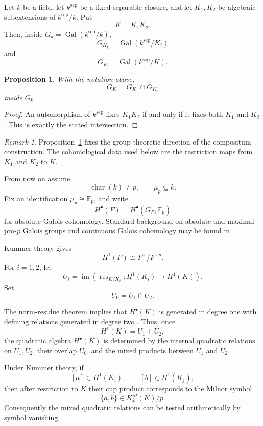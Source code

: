 \documentclass[12pt]{amsart}
\theoremstyle{plain}
\newtheorem{proposition}[theorem]{Proposition}
\theoremstyle{definition}
\theoremstyle{remark}
\newtheorem{remark}[theorem]{Remark}
\numberwithin{equation}{section}
\newcommand{\Fp}{\mathbb{F}_p}
\newcommand{\res}{\operatorname{res}}
\newcommand{\im}{\operatorname{im}}
\begin{document}
Let \(k\) be a field, let \(k^{\mathrm{sep}}\) be a fixed separable
closure, and let \(K_1,K_2\) be algebraic subextensions of
\(k^{\mathrm{sep}}/k\). Put
\[
K=K_1K_2.
\]
Then, inside \(G_k=\operatorname{Gal}(k^{\mathrm{sep}}/k)\),
\[
G_{K_i}=\operatorname{Gal}(k^{\mathrm{sep}}/K_i)
\]
and
\[
G_K=\operatorname{Gal}(k^{\mathrm{sep}}/K).
\]

\begin{proposition}
\label{prop:intersection}
With the notation above,
\[
G_K=G_{K_1}\cap G_{K_2}
\]
inside \(G_k\).
\end{proposition}

\begin{proof}
An automorphism of \(k^{\mathrm{sep}}\) fixes \(K_1K_2\) if and only
if it fixes both \(K_1\) and \(K_2\). This is exactly the stated
intersection.
\end{proof}

\begin{remark}
Proposition~\ref{prop:intersection} fixes the group-theoretic direction of
the compositum construction. The cohomological data used below are the
restriction maps from \(K_1\) and \(K_2\) to \(K\).
\end{remark}

From now on assume
\[
\operatorname{char}(k)\neq p,
\qquad
\mu_p\subseteq k.
\]
Fix an identification \(\mu_p\cong\Fp\), and write
\[
H^\bullet(F)
=
H^\bullet(G_F,\Fp)
\]
for absolute Galois cohomology. Standard background on absolute and
maximal pro-\(p\) Galois groups and continuous Galois cohomology may be found
in \cite{NeukirchSchmidtWingberg}.

Kummer theory gives
\[
H^1(F)\cong F^\times/F^{\times p}.
\]
For \(i=1,2\), let
\[
U_i
=
\im\!\left(
\res_{K/K_i}:H^1(K_i)\longrightarrow H^1(K)
\right).
\]
Set
\[
U_0=U_1\cap U_2.
\]

The norm-residue theorem implies that \(H^\bullet(K)\) is generated
in degree one with defining relations generated in degree two
\cite{WeibelNormResidue}. Thus, once
\[
H^1(K)=U_1+U_2,
\]
the quadratic algebra \(H^\bullet(K)\) is determined by the internal
quadratic relations on \(U_1,U_2\), their overlap \(U_0\), and the
mixed products between \(U_1\) and \(U_2\).

Under Kummer theory, if
\[
[a]\in H^1(K_i),
\qquad
[b]\in H^1(K_j),
\]
then after restriction to \(K\) their cup product corresponds to the
Milnor symbol
\[
\{a,b\}\in K_2^M(K)/p.
\]
Consequently the mixed quadratic relations can be tested
arithmetically by symbol vanishing.
\end{document}
